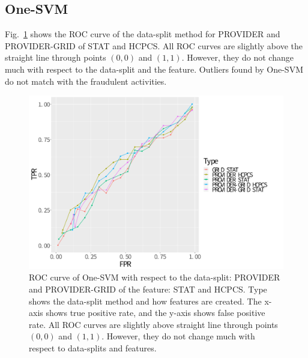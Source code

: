 \documentclass[dvipdfmx, english]{ampmt}             %
\newcommand{\Figref}[1]{Fig.~\ref{#1}}
\begin{document}

\subsection{One-SVM}

\Figref{fig:roc-svm} shows the ROC curve of the data-split method for PROVIDER and PROVIDER-GRID of STAT and HCPCS. All ROC curves are slightly above the straight line through points $(0,0)$ and $(1,1)$. 
However, they do not change much with respect to the data-split and the feature. Outliers found by One-SVM do not match with the fraudulent activities.


\begin{figure}[H]
\centerline{\includegraphics[scale=0.5]{../img/onesvm-roc.pdf}}
\caption{ROC curve of One-SVM with respect to the data-split: PROVIDER and PROVIDER-GRID of the feature: STAT and HCPCS. Type shows the data-split method and how features are created.
The x-axis shows true positive rate, and the y-axis shows false positive rate. All ROC curves are slightly above straight line through points $(0,0)$ and $(1,1)$. However, they do not change much 
with respect to data-splits and features.
}
\label{fig:roc-svm}
\end{figure}
\end{document}
